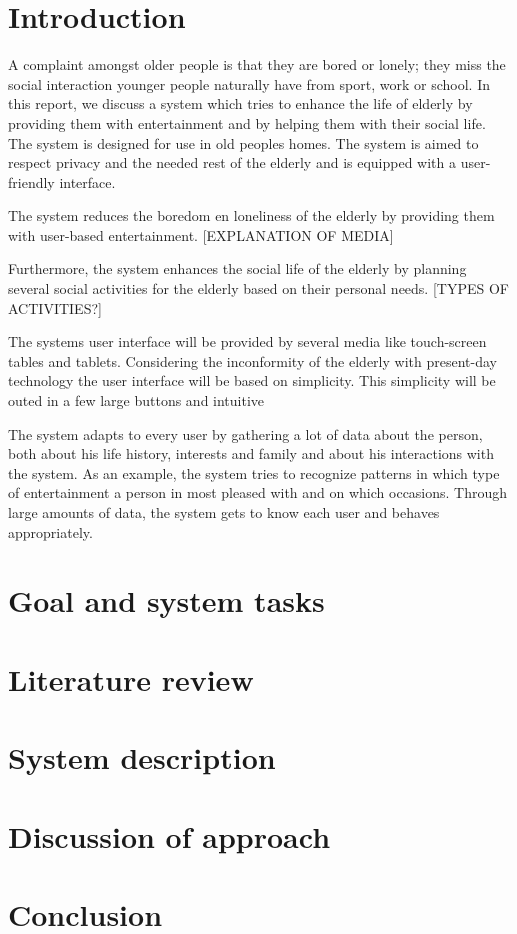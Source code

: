 \documentclass[12pt, a4paper]{article}
\begin{document}
\tableofcontents 
\newpage
\section{Introduction}
A complaint amongst older people is that they are bored or lonely; they miss the social interaction younger people naturally have from sport, work or school. In this report, we discuss a system which tries to enhance the life of elderly by providing them with entertainment and by helping them with their social life. The system is designed for use in old peoples homes. The system is aimed to respect privacy and the needed rest of the elderly and is equipped with a user-friendly interface.

The system reduces the boredom en loneliness of the elderly by providing them with user-based entertainment. [EXPLANATION OF MEDIA]

Furthermore, the system enhances the social life of the elderly by planning several social activities for the elderly based on their personal needs. [TYPES OF ACTIVITIES?]

The systems user interface will be provided by several media like touch-screen tables and tablets. Considering the inconformity of the elderly with present-day technology the user interface will be based on simplicity. This simplicity will be outed in a few large buttons and intuitive 

The system adapts to every user by gathering a lot of data about the person, both about his life history, interests and family and about his interactions with the system. As an example, the system tries to recognize patterns in which type of entertainment a person in most pleased with and on which occasions. Through large amounts of data, the system gets to know each user and behaves appropriately.

\section{Goal and system tasks}

\section{Literature review}

\section{System description}

\section{Discussion of approach}

\section{Conclusion}
\begin{thebibliography}{x}

\end{thebibliography}
\end{document}
